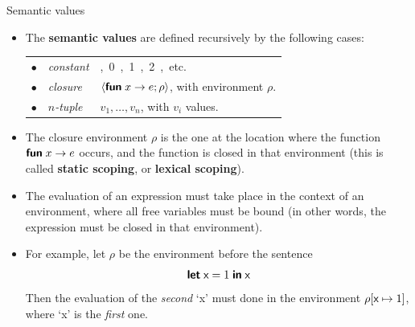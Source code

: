 %
\begin{frame}[fragile]{Semantic values}

  \begin{itemize}

    \item The \textbf{semantic values} are defined recursively by the
      following cases:\\
      \smallskip
      \begin{tabular}{@{\,}r@{\;\;}ll}
        $\bullet$
        & \emph{constant}
        & \unit, \textsf{0}, \textsf{1}, \textsf{2}, etc.\\
        $\bullet$
        & \emph{closure}
        & $\langle \textsf{\textbf{fun}} \; x \rightarrow e; \rho \rangle$, with environment $\rho$.\\
        $\bullet$
        & \emph{$n$-tuple}
        & $v_1, \dots, v_n$, with $v_i$ values.
      \end{tabular}

    \item The closure environment $\rho$ is the one at the location
      where the function $\textsf{\textbf{fun}} \; x \rightarrow e$ occurs, and the
      function is closed in that environment (this is called
      \textbf{static scoping}, or \textbf{lexical scoping}).

    \item The evaluation of an expression must take place in the
      context of an environment, where all free variables must be
      bound (in other words, the expression must be closed in that
      environment).

    \item For example, let $\rho$ be the environment before the
      sentence
      {\setlength{\abovedisplayskip}{2pt}
       \setlength{\belowdisplayskip}{2pt}
      \begin{equation*}
        \textsf{\textbf{let}}\; \textsf{x} = 1 \;\textsf{\textbf{in}}\; \textsf{x}
      \end{equation*}}
      Then the evaluation of the \emph{second} `x' must done in the
      environment $\rho[\textsf{x} \mapsto 1]$, where `x' is
      the \emph{first} one.

  \end{itemize}

\end{frame}

